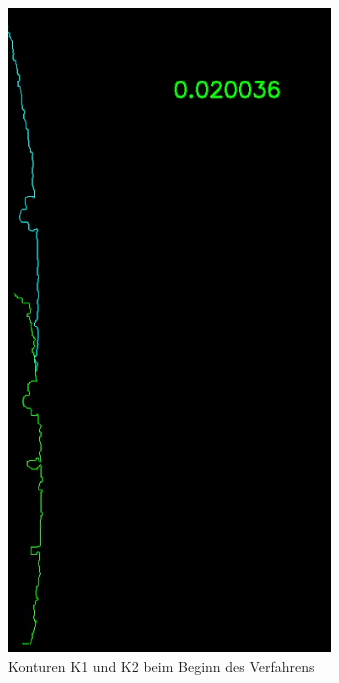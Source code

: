 \documentclass[../main.tex]{subfiles}
\begin{document}
\begin{figure}[h]
\begin{minipage}{0.24\textwidth}
        \caption{Konturen K1 und K2 beim Beginn des Verfahrens}
        \label{fig:stitching_beginn}
    \end{minipage}
    \begin{minipage}{0.24\textwidth}
        \centering
        \includegraphics[width=\textwidth]{images/stitching_middle.PNG} %

\end{minipage}
\end{figure}
\end{document}
